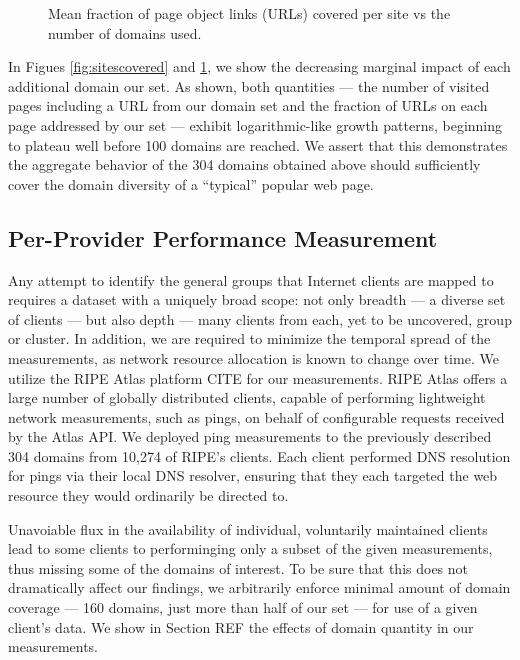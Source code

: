 \begin{figure}
    \caption{Mean fraction of page object links (URLs) covered per site vs the
    number of domains used.
    }
    \label{fig:linkscovered}
\end{figure}

In Figues \ref{fig:sitescovered} and \ref{fig:linkscovered}, we show the
decreasing marginal impact of each additional domain our set. As shown, both
quantities --- the number of visited pages including a URL from our domain set and the
fraction of URLs on each page addressed by our set --- exhibit logarithmic-like
growth patterns, beginning to plateau well before 100 domains are reached. We
assert that this demonstrates the aggregate behavior of the 304 domains obtained above
should sufficiently cover the domain diversity of a ``typical'' popular web page. 

\subsection{Per-Provider Performance Measurement}

Any attempt to identify the general groups that Internet clients are mapped to
requires a dataset with a uniquely broad scope: not only breadth --- a diverse
set of clients --- but also depth --- many clients from each, yet to be
uncovered, group or cluster. In addition, we are required to minimize the
temporal spread of the measurements, as network resource allocation is known to
change over time. We utilize the RIPE Atlas platform CITE for our measurements.
RIPE Atlas offers a large number of globally distributed clients, capable of
performing lightweight network measurements, such as pings, on behalf of
configurable requests received by the Atlas API. We deployed ping measurements
to the previously described 304 domains from 10,274 of RIPE's clients. Each
client performed DNS resolution for pings via their local DNS resolver, ensuring
that they each targeted the web resource they would ordinarily be directed to.

Unavoiable flux in the availability of individual, voluntarily maintained
clients lead to some clients to performinging only a subset of the given
measurements, thus missing some of the domains of interest. To be sure that this
does not dramatically affect our findings, we arbitrarily enforce minimal amount
of domain coverage --- 160 domains, just more than half of our set --- for use
of a given client's data. We show in Section REF the effects of domain quantity
in our measurements.
